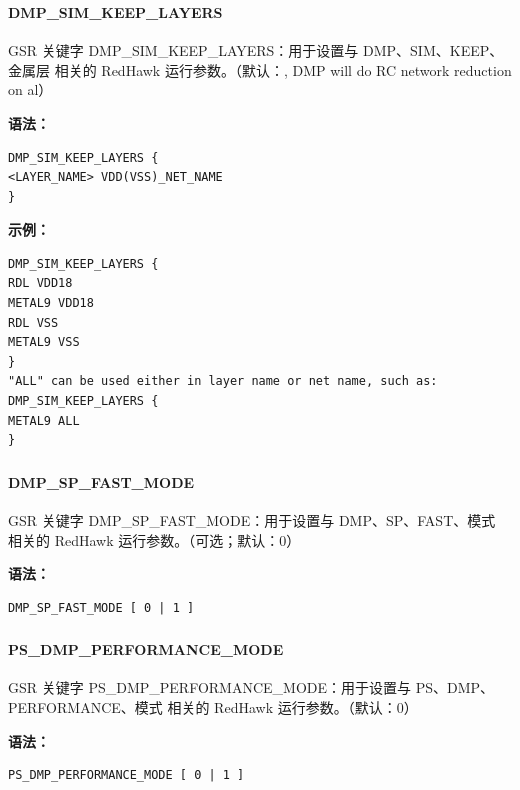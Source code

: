 \subsubsection{}
\paragraph*{DMP_SIM_KEEP_LAYERS}

GSR 关键字 DMP_SIM_KEEP_LAYERS：用于设置与 DMP、SIM、KEEP、金属层 相关的 RedHawk 运行参数。（默认：, DMP will do RC network reduction on al）

\textbf{语法：}
\begin{lstlisting}
DMP_SIM_KEEP_LAYERS {
<LAYER_NAME> VDD(VSS)_NET_NAME
}
\end{lstlisting}

\textbf{示例：}
\begin{lstlisting}
DMP_SIM_KEEP_LAYERS {
RDL VDD18
METAL9 VDD18
RDL VSS
METAL9 VSS
}
"ALL" can be used either in layer name or net name, such as:
DMP_SIM_KEEP_LAYERS {
METAL9 ALL
}
\end{lstlisting}

\subsubsection{}
\paragraph*{DMP_SP_FAST_MODE}

GSR 关键字 DMP_SP_FAST_MODE：用于设置与 DMP、SP、FAST、模式 相关的 RedHawk 运行参数。（可选；默认：0）

\textbf{语法：}
\begin{lstlisting}
DMP_SP_FAST_MODE [ 0 | 1 ]
\end{lstlisting}

\subsubsection{}
\paragraph*{PS_DMP_PERFORMANCE_MODE}

GSR 关键字 PS_DMP_PERFORMANCE_MODE：用于设置与 PS、DMP、PERFORMANCE、模式 相关的 RedHawk 运行参数。（默认：0）

\textbf{语法：}
\begin{lstlisting}
PS_DMP_PERFORMANCE_MODE [ 0 | 1 ]
\end{lstlisting}

